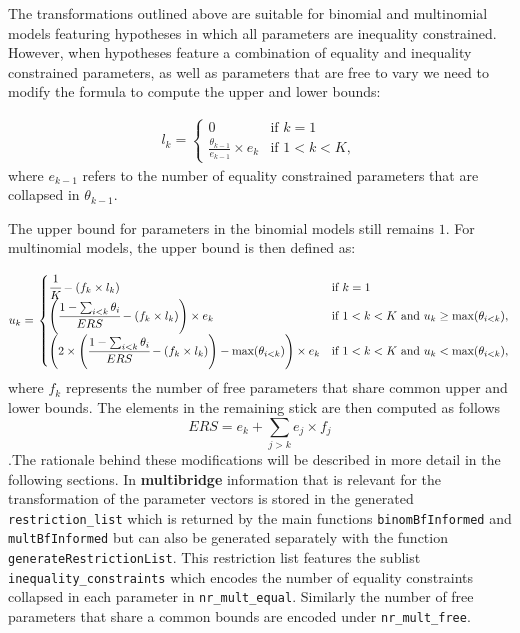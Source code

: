 \documentclass[
  english,
  man,floatsintext]{apa6}
\begin{document}
The transformations outlined above are suitable for binomial and multinomial models featuring hypotheses in which all parameters are inequality constrained. However, when hypotheses feature a combination of equality and inequality constrained parameters, as well as parameters that are free to vary we need to modify the formula to compute the upper and lower bounds:

\begin{align}
  l_k = \left.
  \begin{cases}
      0 & \text{if } k = 1 \\
      \frac{\theta_{k - 1}}{e_{k-1}} \times e_k & \text{if } 1 < k < K,
  \end{cases}
    \right.
\end{align}
where \(e_{k-1}\) refers to the number of equality constrained parameters that are collapsed in \(\theta_{k - 1}\).

The upper bound for parameters in the binomial models still remains \(1\). For multinomial models, the upper bound is then defined as:

\begin{align}
  u_k = \left.
  \begin{cases}
      \cfrac{1}{K} - (f_k \times l_k) & \text{if } k = 1 \\
     \left( \cfrac{1 - \sum_{i < k} \theta_i}{ERS} - (f_k \times l_k) \right) \times e_k & \text{if } 1 < k < K \text{ and } u_k \geq \text{max}(\theta_{i < k}), \\
    \left( 2 \times \left( \cfrac{1 - \sum_{i < k} \theta_i}{ERS} - (f_k \times l_k) \right) - \text{max}(\theta_{i < k}) \right)  \times e_k & \text{if } 1 < k < K \text{ and } u_k < \text{max}(\theta_{i < k}),
  \end{cases}
    \right.
\end{align}
where \(f_k\) represents the number of free parameters that share common upper and lower bounds. The elements in the remaining stick are then computed as follows \[ERS = e_k + \sum_{j > k} e_j \times f_j\].The rationale behind these modifications will be described in more detail in the following sections. In \textbf{multibridge} information that is relevant for the transformation of the parameter vectors is stored in the generated \texttt{restriction\_list} which is returned by the main functions \texttt{binomBfInformed} and \texttt{multBfInformed} but can also be generated separately with the function \texttt{generateRestrictionList}. This restriction list features the sublist \texttt{inequality\_constraints} which encodes the number of equality constraints collapsed in each parameter in \texttt{nr\_mult\_equal}. Similarly the number of free parameters that share a common bounds are encoded under \texttt{nr\_mult\_free}.
\end{document}
